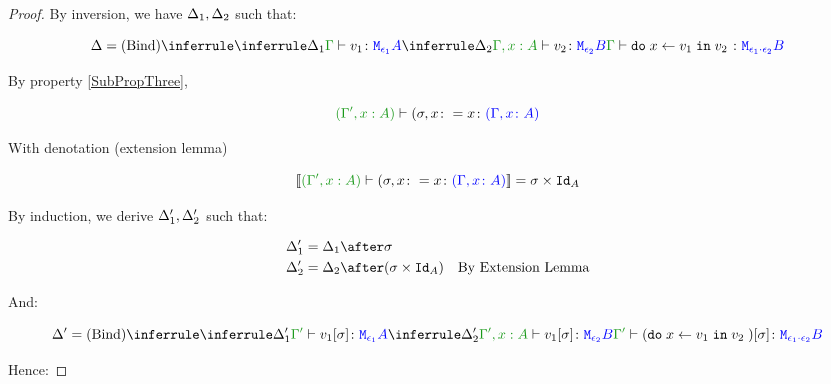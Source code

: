 \documentclass{report}
\begin{document}
\begin{framed}
\begin{proof}
        
        \case{\vbind}
        
        By inversion, we have $\Delta_1, \Delta_2$ such that:
        
        \begin{equation}
            \D = \ntreeruleII{\vbind}{
                \treeruleI{\D_1}{\typerelation{\G}{v_1}{\M{\e_1}{A}}}
                }{
                \treeruleI{\D_2}{\typerelation{\G, x:A }{v_2}{\M{\e_2}{B}}}
            }{
                \typerelation{\G}{\doin{x}{v_1}{v_2}}{\M{\e_1\dot\e_2}{B}}
            }
        \end{equation}
        
        By property \ref{SubPropThree},
        
        \begin{equation}
            \typerelation{(\G', x:A)}{(\si, x\setto x}{(\gax)}
        \end{equation}
        
        With denotation (extension lemma)
        
        \begin{equation}
            \deno{\typerelation{(\G', x:A)}{(\si, x\setto x}{(\gax)}} = \si\times\Id{A}
        \end{equation}
        
        By induction, we derive $\Delta_1', \Delta_2'$ such that:
        
        \begin{align*}
            \D_1' & = \D_1\after \si\\
            \D_2' & = \D_2\after (\si\times\Id{A})\qt{By Extension Lemma}
        \end{align*}
        
        And:
        
        \begin{equation}
            \D' = \ntreeruleII{\vbind}{
                \treeruleI{\D_1'}{\typerelation{\G'}{v_1\ssi}{\M{\e_1}{A}}}
                }{
                \treeruleI{\D_2'}{\typerelation{\G', x:A }{v_1\ssi}{\M{\e_2}{B}}}
            }{
                \typerelation{\G'}{(\doin{x}{v_1}{v_2})\ssi}{\M{\e_1\dot\e_2}{B}}
            }
        \end{equation}
        
        Hence:
        

\end{proof}
\end{framed}
\end{document}

